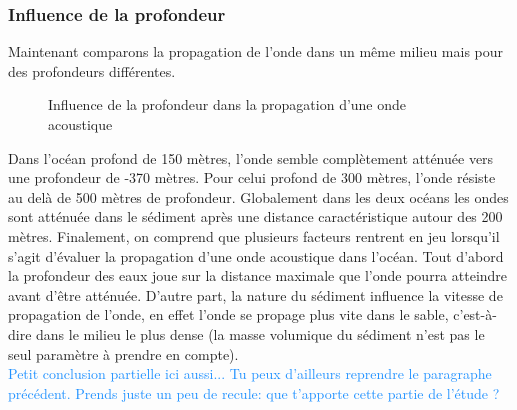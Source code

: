 \documentclass{rapportECC}
\newcommand{\FAadd}[1]{\textcolor{DodgerBlue}{{#1}}}                     %
\begin{document}
\subsubsection{Influence de la profondeur}

Maintenant comparons la propagation de l'onde dans un même milieu mais pour des profondeurs différentes. 

\begin{figure}[H]
    \centering
    \label{fig:image1}\hfill
    \caption{Influence de la profondeur dans la propagation d'une onde acoustique}
    \label{fig:images_cote_a_cote}
\end{figure}
Dans l'océan profond de 150 mètres, l'onde semble complètement atténuée vers une profondeur de -370 mètres. Pour celui profond de 300 mètres, l'onde résiste au delà de 500 mètres de profondeur. Globalement dans les deux océans les ondes sont atténuée dans le sédiment après une distance caractéristique autour des 200 mètres. 
\vspace{1 cm}
Finalement, on comprend que plusieurs facteurs rentrent en jeu lorsqu'il s'agit d'évaluer la propagation d'une onde acoustique dans l'océan. Tout d'abord la profondeur des eaux joue sur la distance maximale que l'onde pourra atteindre avant d'être atténuée. D'autre part, la nature du sédiment influence la vitesse de propagation de l'onde, en effet l'onde se propage plus vite dans le sable, c'est-à-dire dans le milieu le plus dense (la masse volumique du sédiment n'est pas le seul paramètre à prendre en compte).\\
\FAadd{Petit conclusion partielle ici aussi... Tu peux d'ailleurs reprendre le paragraphe précédent. Prends juste un peu de recule: que t'apporte cette partie de l'étude ?}
\end{document}
